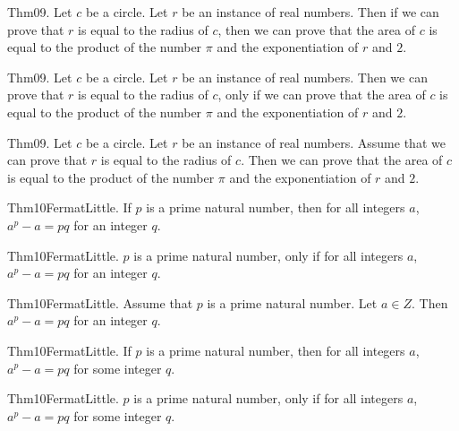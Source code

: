 \documentclass{article}
\begin{document}
Thm09. Let $c$ be a circle. Let $r$ be an instance of real numbers. Then if we can prove that $r$ is equal to the radius of $c$, then we can prove that the area of $c$ is equal to the product of the number \(\pi\) and the exponentiation of $r$ and $2$.

Thm09. Let $c$ be a circle. Let $r$ be an instance of real numbers. Then we can prove that $r$ is equal to the radius of $c$, only if we can prove that the area of $c$ is equal to the product of the number \(\pi\) and the exponentiation of $r$ and $2$.

Thm09. Let $c$ be a circle. Let $r$ be an instance of real numbers. Assume that we can prove that $r$ is equal to the radius of $c$. Then we can prove that the area of $c$ is equal to the product of the number \(\pi\) and the exponentiation of $r$ and $2$.

Thm10FermatLittle. If $p$ is a prime natural number, then for all integers $a$, $a ^ {p}- a = p q$ for an integer $q$.

Thm10FermatLittle. $p$ is a prime natural number, only if for all integers $a$, $a ^ {p}- a = p q$ for an integer $q$.

Thm10FermatLittle. Assume that $p$ is a prime natural number. Let $a \in Z$. Then $a ^ {p}- a = p q$ for an integer $q$.

Thm10FermatLittle. If $p$ is a prime natural number, then for all integers $a$, $a ^ {p}- a = p q$ for some integer $q$.

Thm10FermatLittle. $p$ is a prime natural number, only if for all integers $a$, $a ^ {p}- a = p q$ for some integer $q$.
\end{document}
